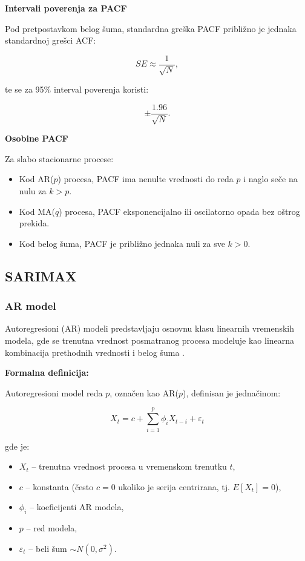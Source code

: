 \documentclass[12pt]{article}
\begin{document}
\noindent \textbf{Intervali poverenja za PACF}

Pod pretpostavkom belog šuma, standardna greška PACF približno je jednaka standardnoj grešci ACF:

\[
SE \approx \frac{1}{\sqrt{N}},
\]

te se za 95\% interval poverenja koristi:

\[
\pm \frac{1.96}{\sqrt{N}}.
\]

\bigskip

\noindent \textbf{Osobine PACF}

Za slabo stacionarne procese:

\begin{itemize}
    \item Kod AR($p$) procesa, PACF ima nenulte vrednosti do reda $p$ i naglo seče na nulu za $k>p$.
    \item Kod MA($q$) procesa, PACF eksponencijalno ili oscilatorno opada bez oštrog prekida.
    \item Kod belog šuma, PACF je približno jednaka nuli za sve $k>0$.
\end{itemize}

\subsection{SARIMAX}

\subsubsection{AR model}

Autoregresioni (AR) modeli predstavljaju osnovnu klasu linearnih vremenskih modela, gde se trenutna vrednost posmatranog procesa modeluje kao linearna kombinacija prethodnih vrednosti i belog šuma \cite{box1970, brockwell2002}.

\noindent\textbf{Formalna definicija:}

Autoregresioni model reda $p$, označen kao AR($p$), definisan je jednačinom:

\begin{equation}
X_t = c + \sum_{i=1}^{p} \phi_i X_{t-i} + \varepsilon_t
\end{equation}

gde je:
\begin{itemize}
    \item $X_t$ -- trenutna vrednost procesa u vremenskom trenutku $t$,
    \item $c$ -- konstanta (često $c=0$ ukoliko je serija centrirana, tj. $E[X_t]=0$),
    \item $\phi_i$ -- koeficijenti AR modela,
    \item $p$ -- red modela,
    \item $\varepsilon_t$ -- beli šum $\sim N(0, \sigma^2)$.
\end{itemize}
\end{document}
